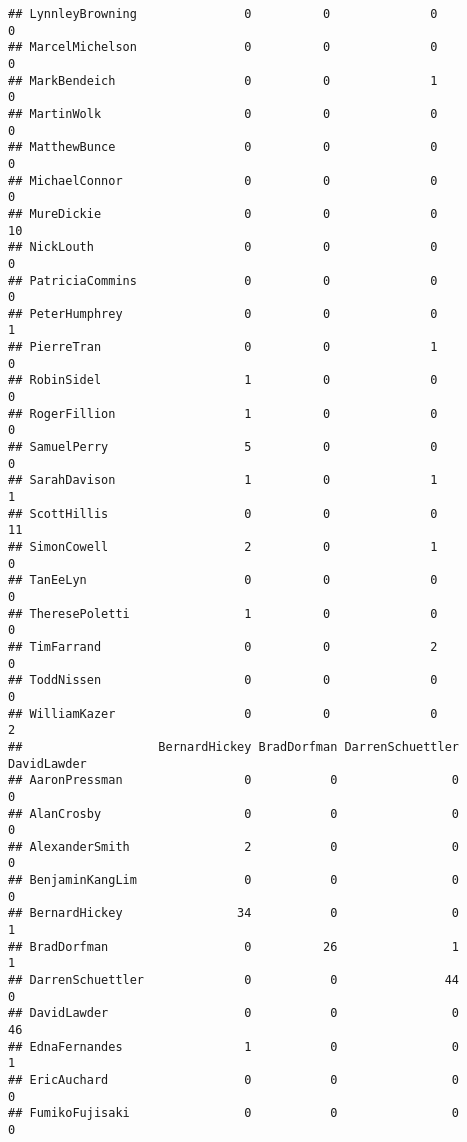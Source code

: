 \documentclass[
  12pt,
]{article}
\begin{document}
\begin{verbatim}
## LynnleyBrowning               0          0              0               0
## MarcelMichelson               0          0              0               0
## MarkBendeich                  0          0              1               0
## MartinWolk                    0          0              0               0
## MatthewBunce                  0          0              0               0
## MichaelConnor                 0          0              0               0
## MureDickie                    0          0              0              10
## NickLouth                     0          0              0               0
## PatriciaCommins               0          0              0               0
## PeterHumphrey                 0          0              0               1
## PierreTran                    0          0              1               0
## RobinSidel                    1          0              0               0
## RogerFillion                  1          0              0               0
## SamuelPerry                   5          0              0               0
## SarahDavison                  1          0              1               1
## ScottHillis                   0          0              0              11
## SimonCowell                   2          0              1               0
## TanEeLyn                      0          0              0               0
## TheresePoletti                1          0              0               0
## TimFarrand                    0          0              2               0
## ToddNissen                    0          0              0               0
## WilliamKazer                  0          0              0               2
##                   BernardHickey BradDorfman DarrenSchuettler DavidLawder
## AaronPressman                 0           0                0           0
## AlanCrosby                    0           0                0           0
## AlexanderSmith                2           0                0           0
## BenjaminKangLim               0           0                0           0
## BernardHickey                34           0                0           1
## BradDorfman                   0          26                1           1
## DarrenSchuettler              0           0               44           0
## DavidLawder                   0           0                0          46
## EdnaFernandes                 1           0                0           1
## EricAuchard                   0           0                0           0
## FumikoFujisaki                0           0                0           0

\end{verbatim}
\end{document}
